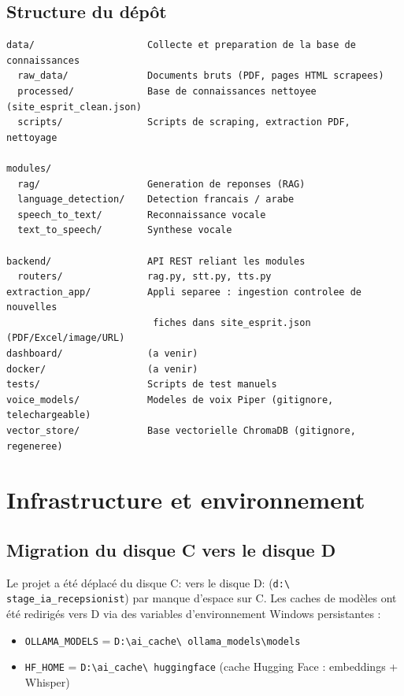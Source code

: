 \documentclass[11pt,a4paper]{report}
\begin{document}
\section{Structure du dépôt}
\begin{verbatim}
data/                    Collecte et preparation de la base de connaissances
  raw_data/              Documents bruts (PDF, pages HTML scrapees)
  processed/             Base de connaissances nettoyee (site_esprit_clean.json)
  scripts/               Scripts de scraping, extraction PDF, nettoyage

modules/
  rag/                   Generation de reponses (RAG)
  language_detection/    Detection francais / arabe
  speech_to_text/        Reconnaissance vocale
  text_to_speech/        Synthese vocale

backend/                 API REST reliant les modules
  routers/               rag.py, stt.py, tts.py
extraction_app/          Appli separee : ingestion controlee de nouvelles
                          fiches dans site_esprit.json (PDF/Excel/image/URL)
dashboard/               (a venir)
docker/                  (a venir)
tests/                   Scripts de test manuels
voice_models/            Modeles de voix Piper (gitignore, telechargeable)
vector_store/            Base vectorielle ChromaDB (gitignore, regeneree)
\end{verbatim}

\chapter{Infrastructure et environnement}

\section{Migration du disque C vers le disque D}
Le projet a été déplacé du disque C: vers le disque D: (\texttt{d:\textbackslash
stage\_ia\_recepsionist}) par manque d'espace sur C. Les caches de modèles ont été
redirigés vers D via des variables d'environnement Windows persistantes :
\begin{itemize}
    \item \texttt{OLLAMA\_MODELS} = \texttt{D:\textbackslash ai\_cache\textbackslash
    ollama\_models\textbackslash models}
    \item \texttt{HF\_HOME} = \texttt{D:\textbackslash ai\_cache\textbackslash
    huggingface} (cache Hugging Face : embeddings + Whisper)
\end{itemize}
\end{document}
